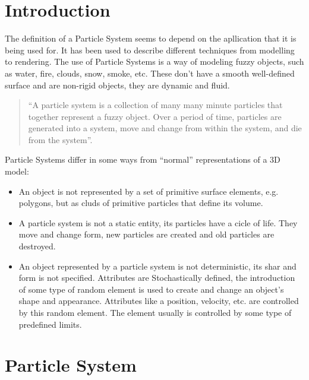 \section{Introduction}

The definition of a Particle System seems to depend on the apllication that it is being used for. It has been used to describe different techniques from modelling to rendering. 
The use of Particle Systems is a way of modeling fuzzy objects, such as water, fire, clouds, snow, smoke, etc. These don't have a smooth well-defined surface and are non-rigid objects, they are dynamic and fluid.
\begin{quote}
  ``A particle system is a collection of many many minute particles that together represent a fuzzy object. Over a period of time, particles are generated into a system, move and change from within the system, and die from the system''.
\end{quote}

Particle Systems differ in some ways from ``normal'' representations of a 3D model:
\begin{itemize}
\item An object is not represented by a set of primitive surface elements, e.g. polygons, but as cluds of primitive particles that define its volume. 
\item A particle system is not a static entity, its particles have a cicle of life. They move and change form, new particles are created and old particles are destroyed.
\item An object represented by a particle system is not deterministic, its shar and form is not specified. Attributes are Stochastically defined, the introduction of some type of random element is used to create and change an object's shape and appearance. Attributes like a position, velocity, etc. are controlled by this random element. The element usually is controlled by some type of predefined limits.
\end{itemize}

\section{Particle System}

